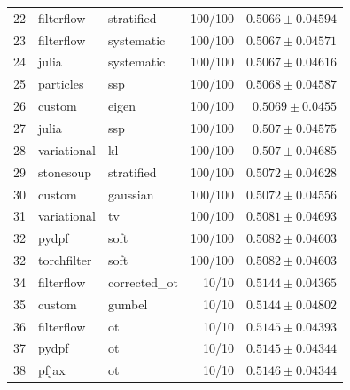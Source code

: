 \begin{table}[!htbp]
\begin{tabular}{rllrr}
22 & filterflow & stratified & 100/100 & $0.5066 \pm 0.04594$ \\
23 & filterflow & systematic & 100/100 & $0.5067 \pm 0.04571$ \\
24 & julia & systematic & 100/100 & $0.5067 \pm 0.04616$ \\
25 & particles & ssp & 100/100 & $0.5068 \pm 0.04587$ \\
26 & custom & eigen & 100/100 & $0.5069 \pm 0.0455$ \\
27 & julia & ssp & 100/100 & $0.507 \pm 0.04575$ \\
28 & variational & kl & 100/100 & $0.507 \pm 0.04685$ \\
29 & stonesoup & stratified & 100/100 & $0.5072 \pm 0.04628$ \\
30 & custom & gaussian & 100/100 & $0.5072 \pm 0.04556$ \\
31 & variational & tv & 100/100 & $0.5081 \pm 0.04693$ \\
32 & pydpf & soft & 100/100 & $0.5082 \pm 0.04603$ \\
32 & torchfilter & soft & 100/100 & $0.5082 \pm 0.04603$ \\
34 & filterflow & corrected\_ot & 10/10 & $0.5144 \pm 0.04365$ \\
35 & custom & gumbel & 10/10 & $0.5144 \pm 0.04802$ \\
36 & filterflow & ot & 10/10 & $0.5145 \pm 0.04393$ \\
37 & pydpf & ot & 10/10 & $0.5145 \pm 0.04344$ \\
38 & pfjax & ot & 10/10 & $0.5146 \pm 0.04344$ \\
\bottomrule
\end{tabular}
\end{table}

